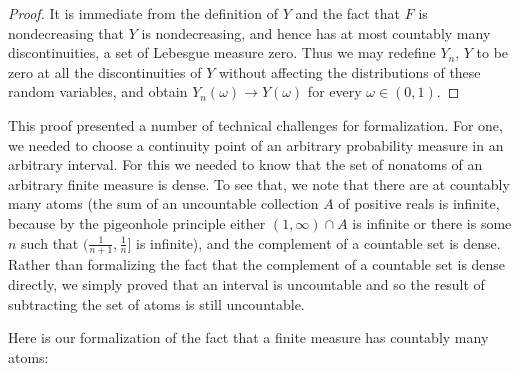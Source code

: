 \documentclass{article}
\theoremstyle{definition}
\begin{document}
\begin{proof}
It is immediate from the definition of $Y$ and the fact that $F$ is nondecreasing that $Y$ is nondecreasing, and hence has at most countably many discontinuities, a set of Lebesgue measure zero. Thus we may redefine $Y_n$, $Y$ to be zero at all the discontinuities of $Y$ without affecting the distributions of these random variables, and obtain $Y_n(\omega) \rightarrow Y(\omega)$ for every $\omega \in (0,1)$.
\end{proof}

This proof presented a number of technical challenges for formalization. For one, we needed to choose a continuity point of an arbitrary probability measure in an arbitrary interval. For this we needed to know that the set of nonatoms of an arbitrary finite measure is dense. To see that, we note that there are at countably many atoms (the sum of an uncountable collection $A$ of positive reals is infinite, because by the pigeonhole principle either $(1,\infty) \cap A$ is infinite or there is some $n$ such that $(\frac{1}{n+1}, \frac{1}{n}]$ is infinite), and the complement of a countable set is dense. Rather than formalizing the fact that the complement of a countable set is dense directly, we simply proved that an interval is uncountable and so the result of subtracting the set of atoms is still uncountable.

Here is our formalization of the fact that a finite measure has countably many atoms:

\medskip
\end{document}
